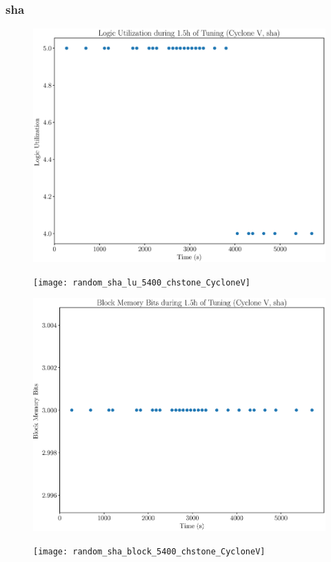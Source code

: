 \documentclass[12pt, a4paper]{article}
\begin{document}
\newpage

\subsubsection{sha}

\begin{figure}[htpb]
    \centering
    \noindent
    \begin{minipage}{.48\textwidth}
        \centering
        \includegraphics[scale=.25]{sha_lu_5400_chstone_CycloneV}
    \end{minipage}%
    \hfill
    \begin{minipage}{.48\textwidth}
        \centering
        \texttt{[image: random\_sha\_lu\_5400\_chstone\_CycloneV]}
    \end{minipage}%

    \begin{minipage}{.48\textwidth}
        \includegraphics[scale=.25]{sha_block_5400_chstone_CycloneV}
    \end{minipage}%
    \hfill
    \begin{minipage}{.48\textwidth}
        \texttt{[image: random\_sha\_block\_5400\_chstone\_CycloneV]}
    \end{minipage}%


\end{figure}
\end{document}
